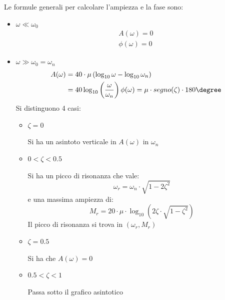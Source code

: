 \documentclass[a4paper]{article}
\begin{document}
\vspace{1em}
\noindent
Le formule generali per calcolare l'ampiezza e la fase sono:
\begin{itemize}
  \item \( \omega \ll \omega_0 \) 
    \[
    \begin{aligned}
      A(\omega) = 0\\
      \phi(\omega) = 0
    \end{aligned}
    \] 
  \item \( \omega \gg \omega_0 = \omega_n \) 
    \[
    \begin{aligned}
      A(\omega) &= 40 \cdot \mu \left( \log_{10} \omega - \log_{10} \omega_n \right) \\
                &= 40 \log_{10} \left( \frac{\omega}{\omega_n} \right) 
      \phi(\omega) = \mu \cdot segno(\zeta) \cdot 180\degree
    \end{aligned}
    \]
    Si distinguono 4 casi:
    \begin{itemize}
      \item \( \zeta = 0 \) 

        Si ha un asintoto verticale in \( A(\omega) \) in \( \omega_n \)

      \item \( 0 < \zeta < 0.5 \)

        Si ha un picco di risonanza che vale:
        \[
          \omega_r = \omega_n \cdot \sqrt{1 - 2 \zeta^2}
        \] 
        e una massima ampiezza di:
        \[
          M_r = 20 \cdot \mu \cdot \log_{10} \left( 2 \zeta \cdot \sqrt{1 - \zeta^2} \right)
        \]
        Il picco di risonanza si trova in \( \left( \omega_r, M_r \right)  \) 

      \item \( \zeta = 0.5 \)

        Si ha che \( A(\omega) = 0\) 

      \item \( 0.5 < \zeta < 1 \) 

        Passa sotto il grafico asintotico
    \end{itemize}
\end{itemize}
\end{document}
